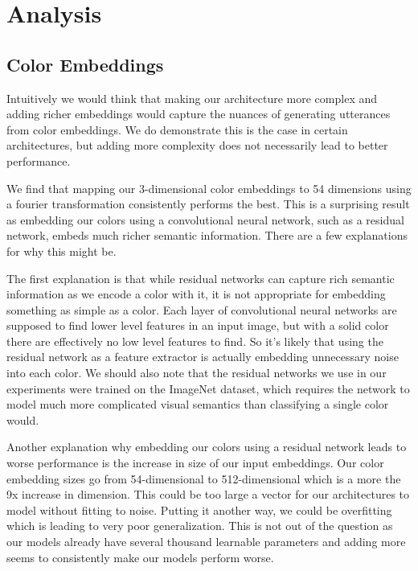 \section{Analysis}

\subsection{Color Embeddings}

Intuitively we would think that making our architecture more complex and adding richer  embeddings would capture the nuances of generating utterances from color embeddings. We do demonstrate this is the case in certain architectures, but adding more complexity does not necessarily lead to better performance.

\par
We find that mapping our 3-dimensional color embeddings to 54 dimensions using a fourier transformation consistently performs the best. This is a surprising result as embedding our colors using a convolutional neural network, such as a residual network, embeds much richer semantic information. There are a few explanations for why this might be.

\par
The first explanation is that while residual networks can capture rich semantic information as we encode a color with it, it is not appropriate for embedding something as simple as a color. Each layer of convolutional neural networks are supposed to find lower level features in an input image, but with a solid color there are effectively no low level features to find. So it’s likely that using the residual network as a feature extractor is actually embedding unnecessary noise into each color. We should also note that the residual networks we use in our experiments were trained on the ImageNet dataset, which requires the network to model much more complicated visual semantics than classifying a single color would.

\par
Another explanation why embedding our colors using a residual network leads to worse performance is the increase in size of our input embeddings. Our color embedding sizes go from 54-dimensional to 512-dimensional which is a more the 9x increase in dimension. This could be too large a vector for our architectures to model without fitting to noise. Putting it  another way, we could be overfitting which is leading to very poor generalization. This is not out of the question as our models already have several thousand learnable parameters and adding more seems to consistently make our models perform worse.

